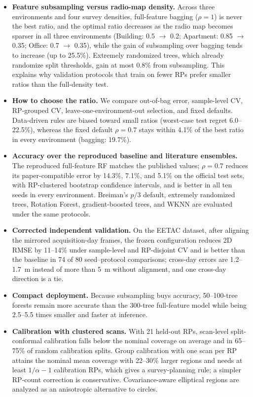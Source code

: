 \begin{itemize}

	\item \textbf{Feature subsampling versus radio-map density.}
	Across three environments and four survey densities, full-feature bagging ($\rho=1$) is never the best ratio, and the optimal ratio decreases as the radio map becomes sparser in all three environments (Building: 0.5 $\rightarrow$ 0.2; Apartment: 0.85 $\rightarrow$ 0.35; Office: 0.7 $\rightarrow$ 0.35), while the gain of subsampling over bagging tends to increase (up to 25.5\%). Extremely randomized trees, which already randomize split thresholds, gain at most 0.8\% from subsampling. This explains why validation protocols that train on fewer RPs prefer smaller ratios than the full-density test.

	\item \textbf{How to choose the ratio.}
	We compare out-of-bag error, sample-level CV, RP-grouped CV, leave-one-environment-out selection, and fixed defaults. Data-driven rules are biased toward small ratios (worst-case test regret 6.0--22.5\%), whereas the fixed default $\rho=0.7$ stays within 4.1\% of the best ratio in every environment (bagging: 19.7\%).

	\item \textbf{Accuracy over the reproduced baseline and literature ensembles.}
	The reproduced full-feature RF matches the published values; $\rho=0.7$ reduces its paper-compatible error by 14.3\%, 7.1\%, and 5.1\% on the official test sets, with RP-clustered bootstrap confidence intervals, and is better in all ten seeds in every environment. Breiman's $p/3$ default, extremely randomized trees, Rotation Forest, gradient-boosted trees, and WKNN are evaluated under the same protocols.

	\item \textbf{Corrected independent validation.}
	On the EETAC dataset, after aligning the mirrored acquisition-day frames, the frozen configuration reduces 2D RMSE by 11--14\% under sample-level and RP-disjoint CV and is better than the baseline in 74 of 80 seed--protocol comparisons; cross-day errors are 1.2--1.7~m instead of more than 5~m without alignment, and one cross-day direction is a tie.

	\item \textbf{Compact deployment.}
	Because subsampling buys accuracy, 50--100-tree forests remain more accurate than the 300-tree full-feature model while being 2.5--5.5 times smaller and faster at inference.

	\item \textbf{Calibration with clustered scans.}
	With 21 held-out RPs, scan-level split-conformal calibration falls below the nominal coverage on average and in 65--75\% of random calibration splits. Group calibration with one scan per RP~\cite{Dunn02102023} attains the nominal mean coverage with 22--30\% larger regions and needs at least $1/\alpha-1$ calibration RPs, which gives a survey-planning rule; a simpler RP-count correction is conservative. Covariance-aware elliptical regions are analyzed as an anisotropic alternative to circles.

\end{itemize}

